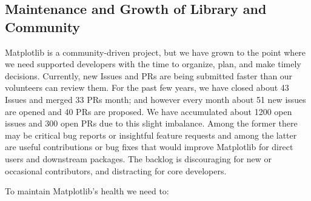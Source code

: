 \documentclass[11pt,letterpaper]{article}  %
\begin{document}
\subsection{Maintenance and Growth of Library and Community}


Matplotlib is a community-driven project, but we have grown to the
point where we need supported developers with the time to organize,
plan, and make timely decisions.  Currently, new Issues and PRs
are being submitted faster than our volunteers can
review them.  For the past few years, we have closed about 43 Issues
and merged 33 PRs month; and however every month about 51 new issues
are opened and 40 PRs are proposed.  We have accumulated about 1200 open issues and
300 open PRs due to this slight imbalance.  Among the former there may be critical bug reports or
insightful feature requests and among the latter are useful
contributions or bug fixes that would improve Matplotlib for direct
users and downstream packages.  The backlog is discouraging for new or
occasional contributors, and distracting for core developers.

To maintain Matplotlib's health we need to:
\end{document}

